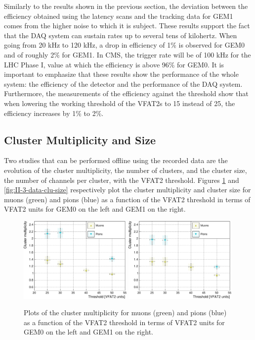       Similarly to the results shown in the previous section, the deviation between the efficiency obtained using the latency scans and the tracking data for GEM1 comes from the higher noise to which it is subject. These results support the fact that the DAQ system can sustain rates up to several tens of kilohertz. When going from 20 kHz to 120 kHz, a drop in efficiency of 1\% is observed for GEM0 and of roughly 2\% for GEM1. In CMS, the trigger rate will be of 100 kHz for the LHC Phase I, value at which the efficiency is above 96\% for GEM0. It is important to emphasize that these results show the performance of the whole system: the efficiency of the detector and the performance of the DAQ system. Furthermore, the measurements of the efficiency against the threshold show that when lowering the working threshold of the VFAT2s to 15 instead of 25, the efficiency increases by 1\% to 2\%.

    \subsection{Cluster Multiplicity and Size}

      Two studies that can be performed offline using the recorded data are the evolution of the cluster multiplicity, the number of clusters, and the cluster size, the number of channels per cluster, with the VFAT2 threshold. Figures \ref{fig:II-3-data-clu-mult} and \ref{fig:II-3-data-clu-size} respectively plot the cluster multiplicity and cluster size for muons (green) and pions (blue) as a function of the VFAT2 threshold in terms of VFAT2 units for GEM0 on the left and GEM1 on the right. \\

      \begin{figure}[h!]
        \centering
        \includegraphics[width=0.49\textwidth]{img/plots/cClusterMultiplicity_Threshold_GEM0-crop}
        \includegraphics[width=0.49\textwidth]{img/plots/cClusterMultiplicity_Threshold_GEM1-crop}
        \caption{Plots of the cluster multiplicity for muons (green) and pions (blue) as a function of the VFAT2 threshold in terms of VFAT2 units for GEM0 on the left and GEM1 on the right.}
        \label{fig:II-3-data-clu-mult}
      \end{figure}

